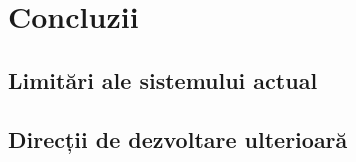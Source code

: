 \chapter{Concluzii}
\section{Limitări ale sistemului actual}
\section{Direcții de dezvoltare ulterioară}
